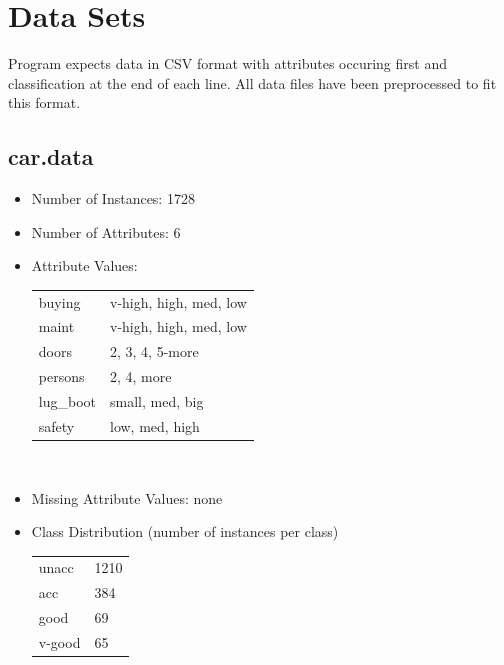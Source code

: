 \documentclass[10pt]{report}
\begin{document}
\section{Data Sets}
Program expects data in CSV format with attributes occuring first and
classification at the end of each line. All data files have been
preprocessed to fit this format.


\subsection*{car.data}
\begin{itemize}
\item Number of Instances: 1728
\item Number of Attributes: 6
\item Attribute Values:
  \\
  \begin{left}
    \begin{tabular}{ l l }
      buying     & v-high, high, med, low \\
      maint      & v-high, high, med, low \\
      doors      & 2, 3, 4, 5-more \\
      persons    & 2, 4, more \\
      lug\_boot  & small, med, big \\
      safety     & low, med, high \\
    \end{tabular}
  \end{left}
  \\
\item Missing Attribute Values: none
\item Class Distribution (number of instances per class)
  \\
  \begin{left}
    \begin{tabular}{ l l }
      unacc   &  1210 \\
      acc     &   384 \\   
      good    &    69 \\     
      v-good  &    65 \\
    \end{tabular}
  \end{left}
\end{itemize}
\end{document}
